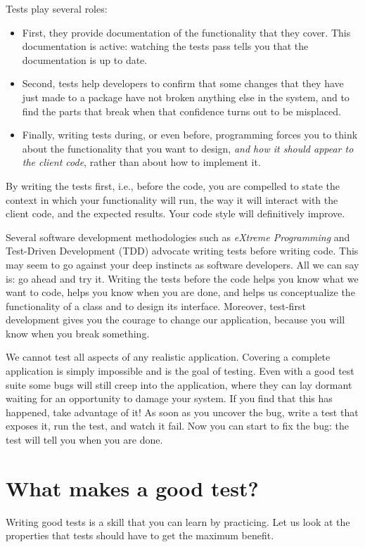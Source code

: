 \documentclass[10pt,twoside,english]{_support/latex/sbabook/sbabook}
\begin{document}
Tests play several roles: 

\begin{itemize}
\item First, they provide documentation of the functionality that they cover. This documentation is active: watching the tests pass tells you that the documentation is up to date. 
\item Second, tests help developers to confirm that some changes that they have just made to a package have not broken anything else in the system, and to find the parts that break when that confidence turns out to be misplaced. 
\end{itemize}

\begin{itemize}
\item Finally, writing tests during, or even before, programming forces you to think about the functionality that you want to design, \textit{and how it should appear to the client code}, rather than about how to implement it.
\end{itemize}

By writing the tests first, i.e., before the code, you are compelled to state
the context in which your functionality will run, the way it will interact with the client code, and the expected results. Your code style will definitively improve.

Several software development methodologies such as \textit{eXtreme Programming} and
Test-Driven Development (TDD) advocate writing tests before writing code. This
may seem to go against your deep instincts as software developers. All we can say
is: go ahead and try it. Writing the tests before the code
helps you know what we want to code, helps you know when you are done, and helps
us conceptualize the functionality of a class and to design its interface.
Moreover, test-first development gives you the courage to change our application, because you will 
know when you break something.

We cannot test all aspects of any realistic application. Covering a complete
application is simply impossible and is the goal of testing. Even
with a good test suite some bugs will still creep into the application, where
they can lay dormant waiting for an opportunity to damage your system. If you
find that this has happened, take advantage of it! As soon as you uncover the
bug, write a test that exposes it, run the test, and watch it fail. Now you can
start to fix the bug: the test will tell you when you are done.
\section{What makes a good test?}
Writing good tests is a skill that you can learn by practicing.
Let us look at the properties that tests should have to get the maximum benefit.
\end{document}
